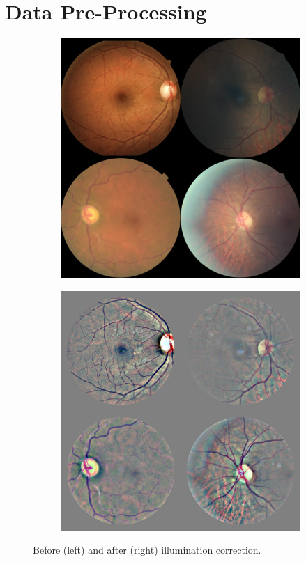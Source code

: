 \section{Data Pre-Processing}

\begin{figure}[h]
    \centering
    \begin{subfigure}{0.45\textwidth}
        \centering
        \includegraphics[width=\linewidth]{datasets/figs/eyepacs_before.png}
    \end{subfigure} %
    \begin{subfigure}{0.45\textwidth}
        \centering
        \includegraphics[width=\linewidth]{datasets/figs/eyepacs_after.png}
    \end{subfigure}
    \caption{Before (left) and after (right) illumination correction.}
    \label{fig:preprocess_before_after}
\end{figure}
